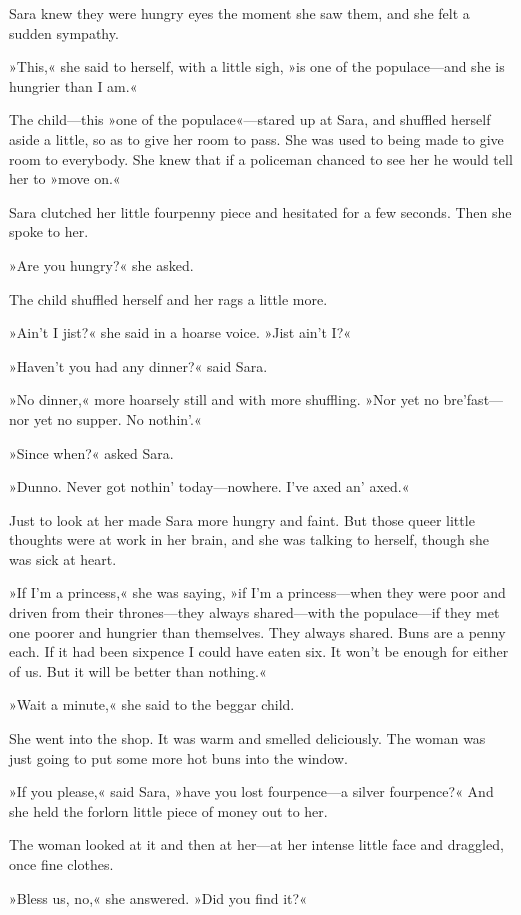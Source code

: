 Sara knew they were hungry eyes the moment she saw them, and she felt a sudden sympathy.

»This,« she said to herself, with a little sigh, »is one of the populace—and she is hungrier than I am.«

The child—this »one of the populace«—stared up at Sara, and shuffled herself aside a little, so as to give her room to pass. She was used to being made to give room to everybody. She knew that if a policeman chanced to see her he would tell her to »move on.«

Sara clutched her little fourpenny piece and hesitated for a few seconds. Then she spoke to her.

»Are you hungry?« she asked.

The child shuffled herself and her rags a little more.

»Ain't I jist?« she said in a hoarse voice. »Jist ain't I?«

»Haven't you had any dinner?« said Sara.

»No dinner,« more hoarsely still and with more shuffling. »Nor yet no bre'fast—nor yet no supper. No nothin'.«

»Since when?« asked Sara.

»Dunno. Never got nothin' today—nowhere. I've axed an' axed.«

Just to look at her made Sara more hungry and faint. But those queer little thoughts were at work in her brain, and she was talking to herself, though she was sick at heart.

»If I'm a princess,« she was saying, »if I'm a princess—when they were poor and driven from their thrones—they always shared—with the populace—if they met one poorer and hungrier than themselves. They always shared. Buns are a penny each. If it had been sixpence I could have eaten six. It won't be enough for either of us. But it will be better than nothing.«

»Wait a minute,« she said to the beggar child.

She went into the shop. It was warm and smelled deliciously. The woman was just going to put some more hot buns into the window.

»If you please,« said Sara, »have you lost fourpence—a silver fourpence?« And she held the forlorn little piece of money out to her.

The woman looked at it and then at her—at her intense little face and draggled, once fine clothes.

»Bless us, no,« she answered. »Did you find it?«

